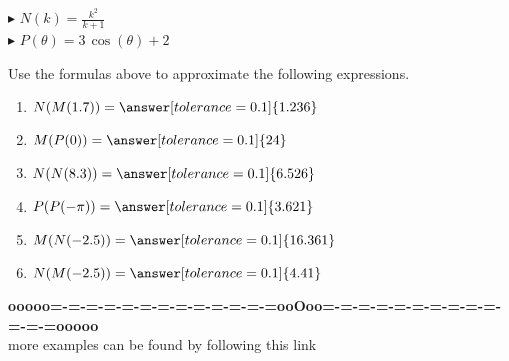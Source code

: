\documentclass{ximera}
\begin{document}
$\blacktriangleright$ $N(k) = \frac{k^2}{k + 1}$ \\

$\blacktriangleright$ $P(\theta) = 3 \, \cos(\theta) + 2$










\begin{question}


Use the formulas above to approximate the following expressions.



\begin{enumerate}

\item $N(M(1.7)) = \answer[tolerance=0.1]{1.236}$ \\

\item $M(P(0)) = \answer[tolerance=0.1]{24}$ \\

\item $N(N(8.3)) = \answer[tolerance=0.1]{6.526}$ \\

\item $P(P(-\pi)) = \answer[tolerance=0.1]{3.621}$ \\

\item $M(N(-2.5)) = \answer[tolerance=0.1]{16.361}$ \\

\item $N(M(-2.5)) = \answer[tolerance=0.1]{4.41}$ \\

\end{enumerate}



\end{question}




















\begin{center}
\textbf{\textcolor{green!50!black}{ooooo=-=-=-=-=-=-=-=-=-=-=-=-=ooOoo=-=-=-=-=-=-=-=-=-=-=-=-=ooooo}} \\

more examples can be found by following this link\\ 

\end{center}
\end{document}
